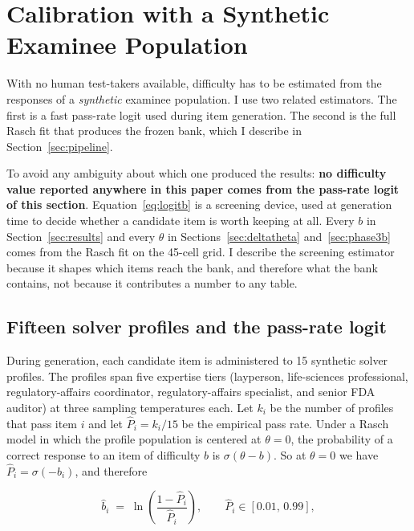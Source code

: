 \section{Calibration with a Synthetic Examinee Population}
\label{sec:calibration}

With no human test-takers available, difficulty has to be estimated from
the responses of a \emph{synthetic} examinee population. I use two
related estimators. The first is a fast pass-rate logit used during item
generation. The second is the full Rasch fit that produces the frozen
bank, which I describe in Section~\ref{sec:pipeline}.

To avoid any ambiguity about which one produced the results:
\textbf{no difficulty value reported anywhere in this paper comes from
the pass-rate logit of this section}. Equation~\eqref{eq:logitb} is a
screening device, used at generation time to decide whether a candidate
item is worth keeping at all. Every $b$ in Section~\ref{sec:results} and
every $\theta$ in Sections~\ref{sec:deltatheta}
and~\ref{sec:phase3b} comes from the Rasch fit on the 45-cell grid. I
describe the screening estimator because it shapes which items reach the
bank, and therefore what the bank contains, not because it contributes a
number to any table.

\subsection{Fifteen solver profiles and the pass-rate logit}
During generation, each candidate item is administered to 15 synthetic
solver profiles. The profiles span five expertise tiers (layperson,
life-sciences professional, regulatory-affairs coordinator,
regulatory-affairs specialist, and senior FDA auditor) at three sampling
temperatures each. Let $k_i$ be the number of profiles that pass item $i$
and let $\hat{P}_i = k_i / 15$ be the empirical pass rate. Under a Rasch
model in which the profile population is centered at $\theta = 0$, the
probability of a correct response to an item of difficulty $b$ is
$\sigma(\theta - b)$. So at $\theta = 0$ we have
$\hat{P}_i = \sigma(-b_i)$, and therefore

\begin{equation}
\hat{b}_i \;=\; \ln\!\left(\frac{1 - \hat{P}_i}{\hat{P}_i}\right),
\qquad \hat{P}_i \in [0.01,\, 0.99],
\label{eq:logitb}
\end{equation}

